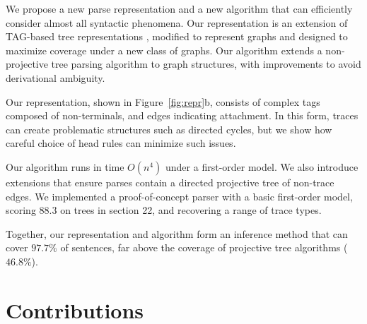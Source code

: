 We propose a new parse representation and a new algorithm that can efficiently consider almost all syntactic phenomena.
Our representation is an extension of TAG-based tree representations \parencite{cck,Shen:2007}, modified to represent graphs and designed to maximize coverage under a new class of graphs.
Our algorithm extends a non-projective tree parsing algorithm \parencite{ec} to graph structures, with improvements to avoid derivational ambiguity.

Our representation, shown in Figure~\ref{fig:repr}b, consists of complex tags composed of non-terminals, and edges indicating attachment.
In this form, traces can create problematic structures such as directed cycles, but we show how careful choice of head rules can minimize such issues.

Our algorithm runs in time $O(n^4)$ under a first-order model.
We also introduce extensions that ensure parses contain a directed projective tree of non-trace edges.
We implemented a proof-of-concept parser with a basic first-order model, scoring $88.3$ on trees in section 22, and recovering a range of trace types.

Together, our representation and algorithm form an inference method that can cover $97.7\%$ of sentences, far above the coverage of projective tree algorithms ($46.8\%$).

\section{Contributions}

